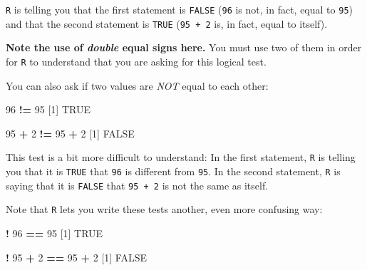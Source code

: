 \documentclass[
]{book}
\newenvironment{Shaded}{\begin{snugshade}}{\end{snugshade}}
\newcommand{\ConstantTok}[1]{\textcolor[rgb]{0.56,0.35,0.01}{#1}}
\newcommand{\DecValTok}[1]{\textcolor[rgb]{0.00,0.00,0.81}{#1}}
\newcommand{\NormalTok}[1]{#1}
\newcommand{\SpecialCharTok}[1]{\textcolor[rgb]{0.81,0.36,0.00}{\textbf{#1}}}
\begin{document}
\texttt{R} is telling you that the first statement is \texttt{FALSE} (\texttt{96} is not, in fact, equal to \texttt{95}) and that the second statement is \texttt{TRUE} (\texttt{95\ +\ 2} is, in fact, equal to itself).

\textbf{Note the use of \emph{double} equal signs here.} You must use two of them in order for \texttt{R} to understand that you are asking for this logical test.

You can also ask if two values are \emph{NOT} equal to each other:

\begin{Shaded}
\begin{Highlighting}[]
\DecValTok{96} \SpecialCharTok{!=} \DecValTok{95}
\NormalTok{[}\DecValTok{1}\NormalTok{] }\ConstantTok{TRUE}
\end{Highlighting}
\end{Shaded}

\begin{Shaded}
\begin{Highlighting}[]
\DecValTok{95} \SpecialCharTok{+} \DecValTok{2} \SpecialCharTok{!=} \DecValTok{95} \SpecialCharTok{+} \DecValTok{2}
\NormalTok{[}\DecValTok{1}\NormalTok{] }\ConstantTok{FALSE}
\end{Highlighting}
\end{Shaded}

This test is a bit more difficult to understand: In the first statement, \texttt{R} is telling you that it is \texttt{TRUE} that \texttt{96} is different from \texttt{95}. In the second statement, \texttt{R} is saying that it is \texttt{FALSE} that \texttt{95\ +\ 2} is not the same as itself.

Note that \texttt{R} lets you write these tests another, even more confusing way:

\begin{Shaded}
\begin{Highlighting}[]
\SpecialCharTok{!} \DecValTok{96} \SpecialCharTok{==} \DecValTok{95}
\NormalTok{[}\DecValTok{1}\NormalTok{] }\ConstantTok{TRUE}
\end{Highlighting}
\end{Shaded}

\begin{Shaded}
\begin{Highlighting}[]
\SpecialCharTok{!} \DecValTok{95} \SpecialCharTok{+} \DecValTok{2} \SpecialCharTok{==} \DecValTok{95} \SpecialCharTok{+} \DecValTok{2}
\NormalTok{[}\DecValTok{1}\NormalTok{] }\ConstantTok{FALSE}
\end{Highlighting}
\end{Shaded}
\end{document}
